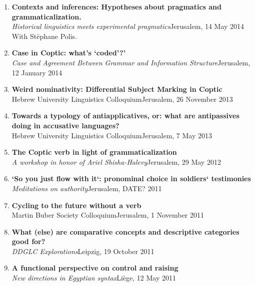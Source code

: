 \documentclass[letterpaper,11pt]{article}
\begin{document}
\begin{enumerate}[resume]
\item \textbf{Contexts and inferences: Hypotheses about pragmatics and grammaticalization.}\\
\textit{Historical linguistics meets experimental pragmatics}\hfill{Jerusalem, 14 May 2014}\\
With St\"ephane Polis.

\item {\textbf{Case in Coptic: what’s ‘coded’?’}}\\\textit{Case and Agreement Between Grammar and Information Structure}\hfill{Jerusalem, 12 January 2014}

\item \textbf{Weird nominativity: Differential Subject Marking in Coptic}\\Hebrew University Linguistics Colloquium\hfill{Jerusalem, 26 November 2013}

\item \textbf{Towards a typology of antiapplicatives, or: what are antipassives doing in accusative languages?}\\
Hebrew University Linguistics Colloquium\hfill{Jerusalem, 7 May 2013}

\item \textbf{The Coptic verb in light of grammaticalization}\\
\textit{A workshop in honor of Ariel Shisha-Halevy}\hfill{Jerusalem, 29 May 2012}\\

\item \textbf{`So you just flow with it`: pronominal choice in soldiers` testimonies}\\
\textit{Meditations on authority}\hfill{Jerusalem, DATE? 2011}

\item \textbf{Cycling to the future without a verb}\\
Martin Buber Society Colloquium\hfill{Jerusalem, 1 November 2011}

\item \textbf{What (else) are comparative concepts and descriptive categories good for?}\\
\textit{DDGLC Explorations}\hfill{Leipzig, 19 October 2011}

\item \textbf{A functional perspective on control and raising}\\ \textit{New directions in Egyptian syntax}\hfill{Li\`{e}ge, 12 May 2011}


\end{enumerate}
\end{document}

